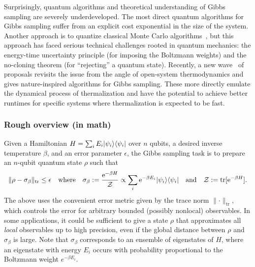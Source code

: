 \begin{refsection}
Surprisingly, quantum algorithms and theoretical understanding of Gibbs sampling are severely underdeveloped. The most direct quantum algorithms for Gibbs sampling suffer from an explicit cost exponential in the size of the system. Another approach is to quantize classical Monte Carlo algorithms~\cite{temme2011quantumMetropolis}, but this approach has faced serious technical challenges rooted in quantum mechanics: the energy-time uncertainty principle (for imposing the Boltzmann weights) and the no-cloning theorem (for ``rejecting'' a quantum state). Recently, a new wave~\cite{chen2021fastThermalization, Shtanko2021AlgorithmsforGibbs, Rall_thermal_22,chen2023QThermalStatePrep} of proposals revisits the issue from the angle of open-system thermodynamics and gives nature-inspired algorithms for Gibbs sampling. These more directly emulate the dynamical process of thermalization and have the potential to achieve better runtimes for specific systems where thermalization is expected to be fast.


\subsubsection*{Rough overview (in math)}

Given a Hamiltonian $H = \sum_i E_i\lvert\psi_i\rangle\langle\psi_i\rvert$ over $n$ qubits, a desired inverse temperature $\beta$, and an error parameter $\epsilon$, the Gibbs sampling task is to prepare an $n$-qubit quantum state $\rho$ such that
\begin{align}
    \lVert \rho - \sigma_{\beta} \rVert_{\mathrm{tr}} \le \epsilon \quad \text{where}\quad \sigma_\beta
    :=\frac{ \mathrm{e}^{-\beta H }}{\mathcal{Z}}\propto \sum_i \mathrm{e}^{-\beta E_i} \lvert\psi_i\rangle\langle\psi_i\rvert \quad \text{and} \quad \mathcal{Z} := \text{tr}[\mathrm{e}^{-\beta H }].
\end{align}
The above uses the convenient error metric given by the trace norm $\lVert \cdot \rVert_{\mathrm{tr}}$, which controls the error for arbitrary bounded (possibly nonlocal) observables. In some applications, it could be sufficient to give a state $\rho$ that approximates all \textit{local} observables up to high precision, even if the global distance between $\rho$ and $\sigma_\beta$ is large. Note that $\sigma_\beta$ corresponds to an ensemble of eigenstates of $H$, where an eigenstate with energy $E_i$ occurs with probability proportional to the Boltzmann weight $e^{-\beta E_i}$.


\end{refsection}
